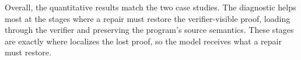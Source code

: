 

Overall, the quantitative results match the two case studies.
The diagnostic helps most at the stages where a repair must restore the verifier-visible proof, loading through the verifier and preserving the program's source semantics.
These stages are exactly where \sys localizes the lost proof, so the model receives what a repair must restore.
